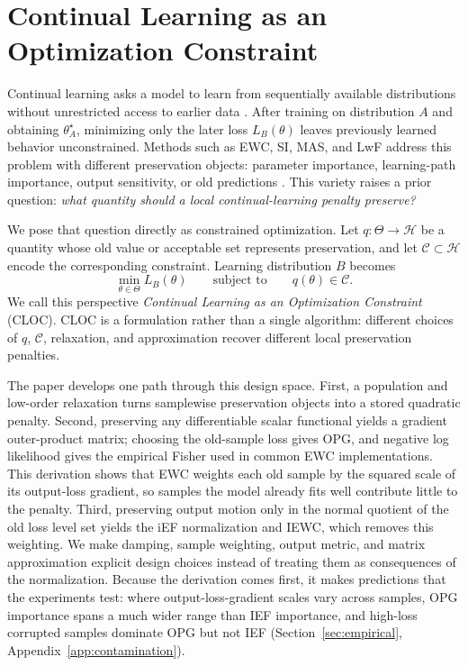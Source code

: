 \section{Continual Learning as an Optimization Constraint}

Continual learning asks a model to learn from sequentially available distributions without unrestricted access to earlier data \citep{McCloskeyCohen1989,French1999,Parisi2019,VanDeVenTolias2019}. After training on distribution $A$ and obtaining $\theta_A^\star$, minimizing only the later loss $L_B(\theta)$ leaves previously learned behavior unconstrained. Methods such as EWC, SI, MAS, and LwF address this problem with different preservation objects: parameter importance, learning-path importance, output sensitivity, or old predictions \citep{EWC,SI,MAS,LwF}. This variety raises a prior question: \emph{what quantity should a local continual-learning penalty preserve?}

We pose that question directly as constrained optimization. Let $q:\Theta\rightarrow\mathcal H$ be a quantity whose old value or acceptable set represents preservation, and let $\mathcal C\subset\mathcal H$ encode the corresponding constraint. Learning distribution $B$ becomes
\[
\min_{\theta\in\Theta} L_B(\theta)
\qquad
\text{subject to}
\qquad
q(\theta)\in\mathcal C.
\]
We call this perspective \emph{Continual Learning as an Optimization Constraint} (CLOC). CLOC is a formulation rather than a single algorithm: different choices of $q$, $\mathcal C$, relaxation, and approximation recover different local preservation penalties.

The paper develops one path through this design space. First, a population and low-order relaxation turns samplewise preservation objects into a stored quadratic penalty. Second, preserving any differentiable scalar functional yields a gradient outer-product matrix; choosing the old-sample loss gives OPG, and negative log likelihood gives the empirical Fisher used in common EWC implementations. This derivation shows that EWC weights each old sample by the squared scale of its output-loss gradient, so samples the model already fits well contribute little to the penalty. Third, preserving output motion only in the normal quotient of the old loss level set yields the iEF normalization and IEWC, which removes this weighting. We make damping, sample weighting, output metric, and matrix approximation explicit design choices instead of treating them as consequences of the normalization. Because the derivation comes first, it makes predictions that the experiments test: where output-loss-gradient scales vary across samples, OPG importance spans a much wider range than IEF importance, and high-loss corrupted samples dominate OPG but not IEF (Section~\ref{sec:empirical}, Appendix~\ref{app:contamination}).

